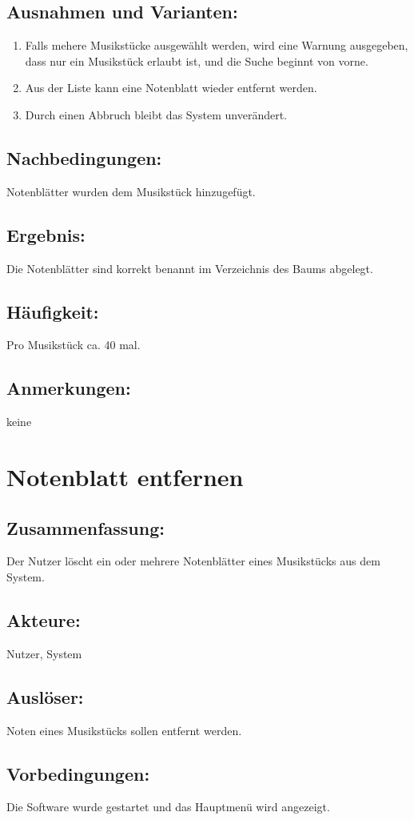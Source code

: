 \documentclass[a4paper,10pt]{scrartcl}
\begin{document}
\subsection{Ausnahmen und Varianten:}
\begin{enumerate}
	\item Falls mehere Musikstücke ausgewählt werden, wird eine Warnung ausgegeben, dass nur ein Musikstück erlaubt ist, und die Suche beginnt von vorne.
	\item Aus der Liste kann eine Notenblatt wieder entfernt werden.
	\item Durch einen Abbruch bleibt das System unverändert.
\end{enumerate}
\subsection{Nachbedingungen:}
Notenblätter wurden dem Musikstück hinzugefügt.
\subsection{Ergebnis:}
Die Notenblätter sind korrekt benannt im Verzeichnis des Baums abgelegt.
\subsection{Häufigkeit:}
Pro Musikstück ca. 40 mal.
\subsection{Anmerkungen:}
keine
\newpage

\section{Notenblatt entfernen}
\label{uc noten entfernen}
\subsection{Zusammenfassung:}
Der Nutzer löscht ein oder mehrere Notenblätter eines Musikstücks aus dem System.
\subsection{Akteure:}
Nutzer, System
\subsection{Auslöser:}
Noten eines Musikstücks sollen entfernt werden.
\subsection{Vorbedingungen:}
Die Software wurde gestartet und das Hauptmenü wird angezeigt.
\end{document}
